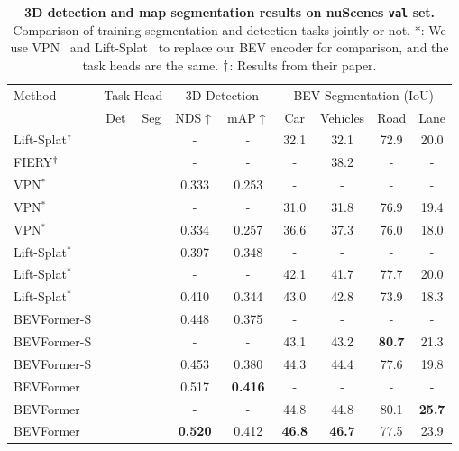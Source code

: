 \documentclass{article}
\newcommand{\cmark}{\ding{51}}\newcommand{\xmark}{\ding{55}}\definecolor{gray9}{gray}{.9}
\begin{document}
\begin{table}[t] 
\begin{center}

\caption{
\textbf{3D detection and map segmentation results on nuScenes \texttt{val} set.}
Comparison of training segmentation and detection tasks jointly or not.
*: We use VPN~\cite{pan2020cross} and Lift-Splat~\cite{philion2020lift} to replace our BEV encoder for comparison, and the task heads are the same. ${\text{\textdagger}}$: Results from their paper.
}

\setlength{\tabcolsep}{2.9mm}
\begin{tabular}{l| c c | c c | c c c c }
\toprule
\multirow{2}{*}{Method}& \multicolumn{2}{c|}{Task Head}
 & \multicolumn{2}{c|}{3D Detection} & \multicolumn{4}{c}{BEV Segmentation (IoU)} \\
&Det& Seg& NDS$\uparrow$ &mAP$\uparrow$  & Car & Vehicles & Road & Lane\\
\midrule
Lift-Splat$^{\text{\textdagger}}$~\cite{philion2020lift} &\xmark &\cmark &- &-& 32.1 & 32.1 & 72.9 &20.0\\
FIERY$^{\text{\textdagger}}$~\cite{hu2021fiery}&\xmark &  \cmark& - &-&- & 38.2 & - & -\\
\midrule
VPN$^*$~\cite{pan2020cross} & \cmark & \xmark & 0.333 & 0.253   &- & - &- &-\\
VPN$^*$ &\xmark &\cmark & - & -  & 31.0 & 31.8 &76.9 &19.4 \\
VPN$^*$ &\cmark & \cmark& 0.334 & 0.257  &36.6 & 37.3 & 76.0 & 18.0\\
Lift-Splat$^*$& \cmark &\xmark & 0.397 & 0.348  & -&-&-&-\\
Lift-Splat$^*$ &\xmark &\cmark &- &- &42.1 & 41.7 &77.7 & 20.0 \\
Lift-Splat$^*$& \cmark & \cmark&  0.410 & 0.344&  43.0 & 42.8 & 73.9 & 18.3\\
\rowcolor{gray95}
BEVFormer-S&\cmark & \xmark & 0.448 & 0.375&  -& - & - & -\\
\rowcolor{gray95}
BEVFormer-S& \xmark& \cmark  &- &-&43.1  &43.2  &\textbf{80.7} &21.3 \\
\rowcolor{gray95}
BEVFormer-S&\cmark & \cmark & 0.453 & 0.380 &  44.3& 44.4 & 77.6 & 19.8\\

\rowcolor{gray9}
BEVFormer&  \cmark  &\xmark & 0.517 & \textbf{0.416} &- & - & - & -\\
\rowcolor{gray9}
BEVFormer&\xmark & \cmark& - &-&44.8 & 44.8 & 80.1 & \textbf{25.7}\\
\rowcolor{gray9}
BEVFormer&\cmark & \cmark & \textbf{0.520} & 0.412 & \textbf{46.8} & \textbf{46.7} & 77.5 & 23.9\\

\bottomrule


\end{tabular} \label{table:multi-tasks}
\end{center}
\end{table}
\end{document}
